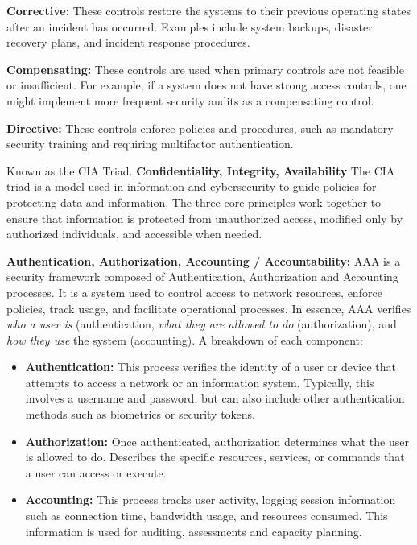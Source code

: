 \textbf{Corrective:} These controls restore the systems to their previous operating states after an incident has occurred. Examples include system backups, disaster recovery plans, and incident response procedures.

\textbf{Compensating:} These controls are used when primary controls are not feasible or insufficient. For example, if a system does not have strong access controls, one might implement more frequent security audits as a compensating control.

\textbf{Directive:} These controls enforce policies and procedures, such as mandatory security training and requiring multifactor authentication.

 Known as the CIA Triad. \textbf{Confidentiality, Integrity, Availability} The CIA triad is a model used in information and cybersecurity to guide policies for protecting data and information. The three core principles work together to ensure that information is protected from unauthorized access, modified only by authorized individuals, and accessible when needed.

 \textbf{Authentication, Authorization, Accounting / Accountability:} AAA is a security framework composed of Authentication, Authorization and Accounting processes. It is a system used to control access to network resources, enforce policies, track usage, and facilitate operational processes. In essence, AAA verifies \textit{who a user is} (authentication, \textit{what they are allowed to do} (authorization), and \textit{how they use} the system (accounting). A breakdown of each component:
\begin{itemize}
    \item \textbf{Authentication:} This process verifies the identity of a user or device that attempts to access a network or an information system. Typically, this involves a username and password, but can also include other authentication methods such as biometrics or security tokens.
    \item \textbf{Authorization:} Once authenticated, authorization determines what the user is allowed to do. Describes the specific resources, services, or commands that a user can access or execute.
    \item \textbf{Accounting:} This process tracks user activity, logging session information such as connection time, bandwidth usage, and resources consumed. This information is used for auditing, assessments and capacity planning.
\end{itemize}


